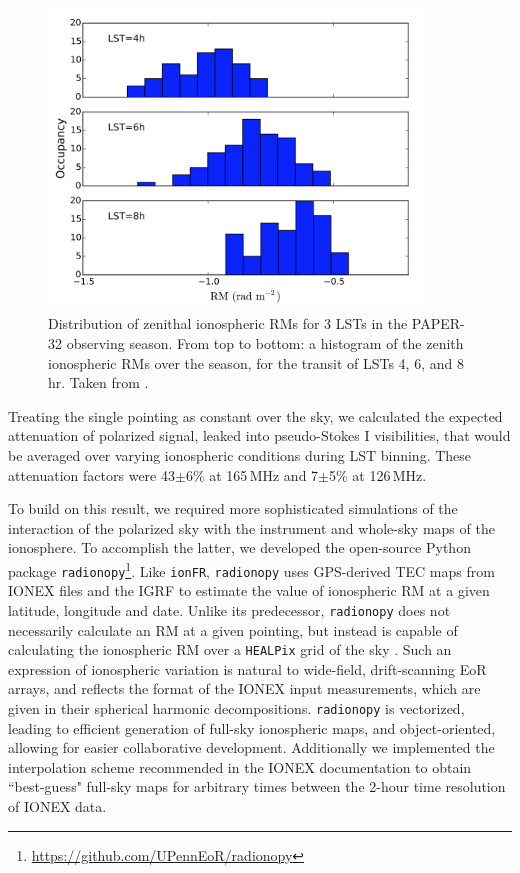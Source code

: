 \begin{figure}
\centering
\includegraphics[width=0.9\textwidth]{chapters/ionosphere/figures/MooreHist.png}
\caption[Distribution of zenithal ionospheric RMs for 3 LSTs in the PAPER-32 observing season]{Distribution of zenithal ionospheric RMs for 3 LSTs in the PAPER-32 observing season. From top to bottom: a histogram of the zenith ionospheric RMs over the season, for the transit of LSTs 4, 6, and 8 hr. Taken from \cite{Moore.17}.}
\label{fig:ionosphere_psa32hist}
\end{figure}

Treating the single pointing as constant over the sky, we calculated the expected attenuation of polarized signal, leaked into pseudo-Stokes I visibilities, that would be averaged over varying ionospheric conditions during LST binning. These attenuation factors were 43$\pm$6\% at 165\,MHz and 7$\pm$5\% at 126\,MHz.

To build on this result, we required more sophisticated simulations of the interaction of the polarized sky with the instrument and whole-sky maps of the ionosphere. To accomplish the latter, we developed the open-source Python package {\tt radionopy}\footnote{\url{https://github.com/UPennEoR/radionopy}}. Like {\tt ionFR}, {\tt radionopy} uses GPS-derived TEC maps from IONEX files and the IGRF to estimate the value of ionospheric RM at a given latitude, longitude and date. Unlike its predecessor, {\tt radionopy} does not necessarily calculate an RM at a given pointing, but instead is capable of calculating the ionospheric RM over a {\tt HEALPix} grid of the sky \citep{healpix}. Such an expression of ionospheric variation is natural to wide-field, drift-scanning EoR arrays, and reflects the format of the IONEX input measurements, which are given in their spherical harmonic decompositions. {\tt radionopy} is vectorized, leading to efficient generation of full-sky ionospheric maps, and object-oriented, allowing for easier collaborative development. Additionally we implemented the interpolation scheme recommended in the IONEX documentation to obtain ``best-guess" full-sky maps for arbitrary times between the 2-hour time resolution of IONEX data. 

